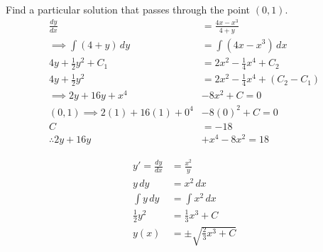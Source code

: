 \documentclass[twoside]{report}
\begin{document}
    \np
    \begin{example}
        Find a particular solution that passes through the point $(0, 1)$.
        \begin{align}
            \frac{dy}{dx} &= \frac{4x-x^{3}}{4 + y}\\
            \implies \int (4 + y)\,dy &= \int(4x-x^{3})\,dx\\
            4y+\frac{1}{2}y^{2} + C_1 &= 2 x^{2}-\frac{1}{4}x^{4} + C_2\\
            4y + \frac{1}{2} y^{2} &= 2 x^{2} - \frac{1}{4} x^{4} + (C_2 - C_1)\\
            \implies 2y + 16y + x^{4} &- 8x^{2} + C = 0\\
            (0, 1) \implies 2(1) + 16(1) + 0^{4} &- 8(0)^{2} + C = 0\\
            C &= -18\\
            \therefore 2y + 16y &+ x^{4} - 8x^{2} = 18
        \end{align}
    \end{example}
    \begin{homework}
        \begin{align}
            y' = \frac{dy}{dx} &= \frac{x^{2}}{y}\\
            y\,dy &= x^{2}\,dx\\
            \int y\,dy &= \int x^{2}\,dx\\
            \frac{1}{2}y^{2} &= \frac{1}{3}x^{3} + C\\
            y(x) &= \pm \sqrt{\frac{2}{3}x^{3} + C}
        \end{align}
    \end{homework}
\end{document}
